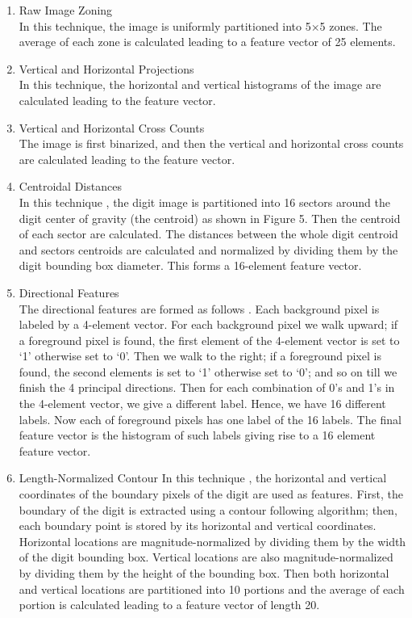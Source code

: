 \documentclass[conference]{IEEEtran}
\begin{document}
\begin{enumerate}
  \item Raw Image Zoning \\
  In this technique, the image is uniformly partitioned into 5×5 zones\cite{Trier1996}. The average of each zone is calculated leading to a feature vector of 25 elements.

	\item Vertical and Horizontal Projections \\
	In this technique, the horizontal and vertical histograms of the image are calculated leading to the feature vector. \cite{Trier1996}

	\item Vertical and Horizontal Cross Counts \\ The image is first binarized, and then the vertical and horizontal cross counts are calculated leading to the feature vector.
	\item  Centroidal Distances \\
In this technique \cite{ElSherif2007}, the digit image is partitioned into 16 sectors around the digit center of gravity (the centroid) as shown in Figure 5. Then the centroid of each sector are calculated. The distances between the whole digit centroid and sectors centroids are calculated and normalized by dividing them by the digit bounding box diameter. This forms a 16-element feature vector.

\item Directional Features\\
The directional features are formed as follows \cite{ElSherif2007}. Each background pixel is labeled by a 4-element vector. For each background pixel we walk upward; if a foreground pixel is found, the first element of the 4-element vector is set to ‘1’ otherwise set to ‘0’. Then we walk to the right; if a foreground pixel is found, the second elements is set to ‘1’ otherwise set to ‘0’; and so on till we finish the 4 principal directions. Then for each combination of 0’s and 1’s in the 4-element vector, we give a different label. Hence, we have 16 different labels. Now each of foreground pixels has one label of the 16 labels. The final feature vector is the histogram of such labels giving rise to a 16 element feature vector.
\item Length-Normalized Contour
In this technique \cite{ElSherif2007}, the horizontal and vertical coordinates of the boundary pixels of the digit are used as features. First, the boundary of the digit is extracted using a contour following algorithm; then, each boundary point is stored by its horizontal and vertical coordinates. Horizontal locations are magnitude-normalized by dividing them by the width of the digit bounding box. Vertical locations are also magnitude-normalized by dividing them by the height of the bounding box. Then both horizontal and vertical locations are partitioned into 10 portions and the average of each portion is calculated leading to a feature vector of length 20.


\end{enumerate}
\end{document}
